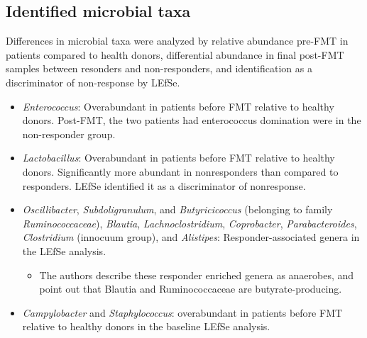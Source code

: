 \documentclass[11pt,a4paper]{article}
\begin{document}
\subsection{Identified microbial taxa}
Differences in microbial taxa were analyzed by relative abundance pre-FMT in patients compared to health donors, differential abundance in final post-FMT samples between resonders and non-responders, and identification as a discriminator of non-response by LEfSe. 
\begin{itemize}
\item \textit{Enterococcus}: Overabundant in patients before FMT relative to healthy donors. Post-FMT, the two patients had enterococcus domination were in the non-responder group.
\item \textit{Lactobacillus}: Overabundant in patients before FMT relative to healthy donors. Significantly more abundant in nonresponders than compared to responders. LEfSe identified it as a discriminator of nonresponse.
\item \textit{Oscillibacter}, \textit{Subdoligranulum}, and \textit{Butyricicoccus} (belonging to family \textit{Ruminococcaceae}), \textit{Blautia}, \textit{Lachnoclostridium}, \textit{Coprobacter}, \textit{Parabacteroides}, \textit{Clostridium} (innocuum group), and \textit{Alistipes}: Responder-associated genera in the LEfSe analysis.
\begin{itemize}
    \item The authors describe these responder enriched genera as anaerobes, and point out that Blautia and Ruminococcaceae are butyrate-producing. 
\end{itemize}
\item \textit{Campylobacter} and \textit{Staphylococcus}: overabundant in patients before FMT relative to healthy donors in the baseline LEfSe analysis.
\end{itemize}
\end{document}
